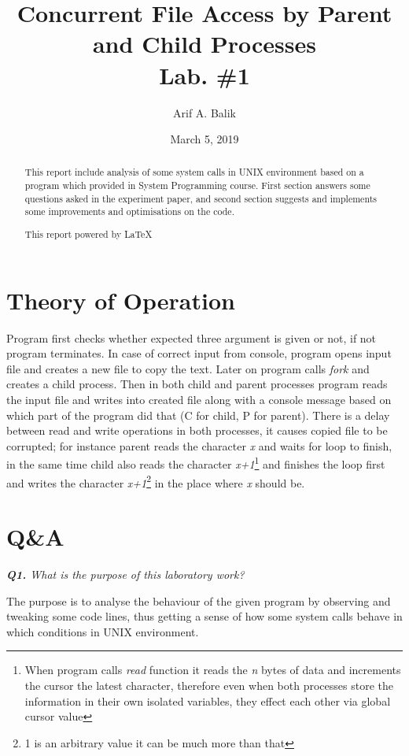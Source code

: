 \documentclass[11pt]{article}
\title{Concurrent File Access by Parent and Child Processes \\Lab. \#1}
\author{Arif A. Balik}
\affil{Undergraduate Student\\
	Sytstems Programming\\
	Department of Computer Science\\
	Arel University\\
	Büyükçekmece, İstanbul 34537\\
    Email: arifbalik@outlook.com
}
\date{March 5, 2019}                                           %
\begin{document}
\maketitle

\begin{abstract}
This report include analysis of some system calls in UNIX environment based on a program which provided in System Programming course. First section answers some questions asked in the experiment paper, and second section suggests and implements some improvements and optimisations on the code.

This report powered by \LaTeX{}
\end{abstract}

\section*{Theory of Operation}
Program first checks whether expected three argument is given or not, if not program terminates. In case of correct input from console, program opens input file and creates a new file to copy the text. Later on program calls \textit{fork} and creates a child process. Then in both child and parent processes program reads the input file and writes into created file along with a console message based on which part of the program did that (C for child, P for parent). There is a delay between read and write operations in both processes, it causes copied file to be corrupted; for instance parent reads the character \textit{x} and waits for loop to finish, in the same time child also reads the character \textit{x+1}\footnote{When program calls \textit{read} function it reads the \textit{n} bytes of data and increments the cursor the latest character, therefore even when both processes store the information in their own isolated variables, they effect each other via global cursor value} and finishes the loop first and writes the character \textit{x+1}\footnote{1 is an arbitrary value it can be much more than that} in the place where \textit{x} should be.
\section*{Q\&A}

\textit{\textbf{Q1.} What is the purpose of this laboratory work?}
\vspace{3mm}

The purpose is to analyse the behaviour of the given program by observing and tweaking some code lines, thus getting a sense of how some system calls behave in which conditions in UNIX environment.
\end{document}
